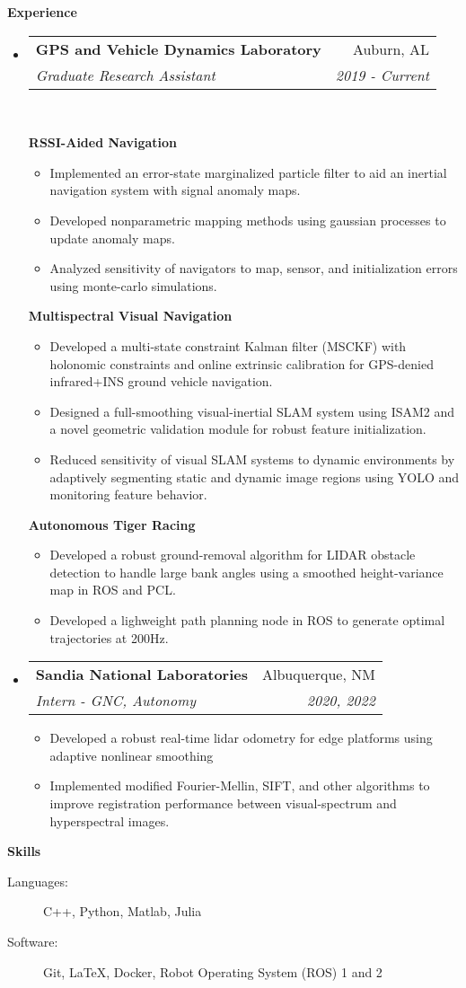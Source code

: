 \documentclass[letterpaper,11pt]{article}
\makeatletter
\newcommand{\resitem}[1]{\item #1 \vspace{-2pt}}
\newcommand{\resheading}[1]{\vspace{10pt} \Large \textbf{#1} \normalsize}
\newcommand{\ressubheading}[4]{
\begin{tabular*}{6.5in}{l@{\extracolsep{\fill}}r}
		\large \textbf{#1} \normalsize & #2 \\
		\textit{#3} & \textit{#4} \\
\end{tabular*}\vspace{-5pt}}
\makeatother
\begin{document}
\resheading{Experience}
\begin{itemize}

\item
	\ressubheading{GPS and Vehicle Dynamics Laboratory}{Auburn, AL}{Graduate Research Assistant}{2019 - Current}\\
	\vspace{10pt}

	\large \textbf{RSSI-Aided Navigation} \normalsize
	\vspace{-5pt}
	\begin{itemize}
		\item Implemented an error-state marginalized particle filter to aid an inertial navigation system with signal anomaly maps.
		\item Developed nonparametric mapping methods using gaussian processes to update anomaly maps.
		\item Analyzed sensitivity of navigators to map, sensor, and initialization errors using monte-carlo simulations.
	\end{itemize}

	\large \textbf{Multispectral Visual Navigation} \normalsize
	\vspace{-5pt}
	\begin{itemize}
		\resitem{Developed a multi-state constraint Kalman filter (MSCKF) with holonomic constraints and online extrinsic calibration for GPS-denied infrared+INS ground vehicle navigation.}
		\resitem{Designed a full-smoothing visual-inertial SLAM system using ISAM2 and a novel geometric validation module for robust feature initialization.}
		\resitem{Reduced sensitivity of visual SLAM systems to dynamic environments by adaptively segmenting static and dynamic image regions using YOLO and monitoring feature behavior.}
	\end{itemize}

	\large \textbf{Autonomous Tiger Racing} \normalsize
	\vspace{-5pt}
	\begin{itemize}
		\resitem{Developed a robust ground-removal algorithm for LIDAR obstacle detection to handle large bank angles using a smoothed height-variance map in ROS and PCL.}
		\resitem{Developed a lighweight path planning node in ROS to generate optimal trajectories at 200Hz.}
	\end{itemize}

\item
	\ressubheading{Sandia National Laboratories}{Albuquerque, NM}{Intern - GNC, Autonomy}{2020, 2022}
	\begin{itemize}
		\item Developed a robust real-time lidar odometry for edge platforms using adaptive nonlinear smoothing
		\item Implemented modified Fourier-Mellin, SIFT, and other algorithms to improve registration performance between visual-spectrum and hyperspectral images.
	\end{itemize}

\end{itemize}

\resheading{Skills}

\begin{description}
\item[Languages:]
C++, Python, Matlab, Julia
\item[Software:]
Git, \LaTeX, Docker, Robot Operating System (ROS) 1 and 2
\end{description}
\end{document}
